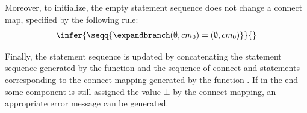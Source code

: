 Moreover, to initialize, the empty statement sequence does not change a connect map, specified by the following rule:
{\begin{gather*}
    \infer{\seqq{\expandbranch(\emptyset, cm_0) = (\emptyset, cm_0)}}
    {} %
\end{gather*}}

Finally, the statement sequence is updated by concatenating the statement sequence generated by the function  \expandbranch{} and the sequence of connect and  statements corresponding to the connect mapping generated by the function \expandbranch.
If in the end some component is still assigned the value $\bot$ by the connect mapping, an appropriate error message can be generated.

